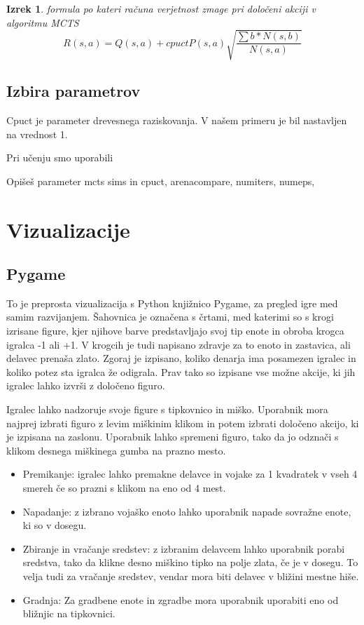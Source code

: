 \documentclass[a4paper, 12pt]{book}
\newtheorem{izrek}{Izrek}[chapter]
\begin{document}
\begin{izrek}
	\label{iz:1}
	formula po kateri računa verjetnost zmage pri določeni akciji v algoritmu MCTS
	\begin{equation}
	R(s,a) = Q(s,a) + cpuctP(s, a)\sqrt{\dfrac{\sum{b}*N(s,b)}{N(s,a)}}
	\label{eq:mctsFormula}
	\end{equation}
\end{izrek}

\section{Izbira parametrov}
Cpuct je parameter drevesnega raziskovanja. V našem primeru je bil nastavljen na vrednost 1.

Pri učenju smo uporabili 

Opišeš parameter mcts sims in cpuct, arenacompare, numiters, numeps, 






\chapter{Vizualizacije}
\label{chvizualizacija}

\section{Pygame}
To je preprosta vizualizacija s Python knjižnico Pygame, za pregled igre med samim razvijanjem. Šahovnica je označena s črtami, med katerimi so s krogi izrisane figure, kjer njihove barve predstavljajo svoj tip enote in obroba krogca igralca -1 ali +1.
V krogcih je tudi napisano zdravje za to enoto in zastavica, ali delavec prenaša zlato.
Zgoraj je izpisano, koliko denarja ima posamezen igralec in koliko potez sta igralca že odigrala. Prav tako so izpisane vse možne akcije, ki jih igralec lahko izvrši z določeno figuro.

Igralec lahko nadzoruje svoje figure s tipkovnico in miško.
Uporabnik mora najprej izbrati figuro z levim miškinim klikom in potem izbrati določeno akcijo, ki je izpisana na zaslonu. Uporabnik lahko spremeni figuro, tako da jo odznači s klikom desnega miškinega gumba na prazno mesto.

\begin{itemize}
	\item Premikanje: igralec lahko premakne delavce in vojake za 1 kvadratek v vseh 4 smereh če so prazni s klikom na eno od 4 mest.
	\item Napadanje: z izbrano vojaško enoto lahko uporabnik napade sovražne enote, ki so v dosegu.
	\item Zbiranje in vračanje sredstev: z izbranim delavcem lahko uporabnik porabi sredstva, tako da klikne desno miškino tipko na polje zlata, če je v dosegu. To velja tudi za vračanje sredstev, vendar mora biti delavec v bližini mestne hiše.
	\item Gradnja: Za gradbene enote in zgradbe mora uporabnik uporabiti eno od bližnjic na tipkovnici.
\end{itemize}
\end{document}
